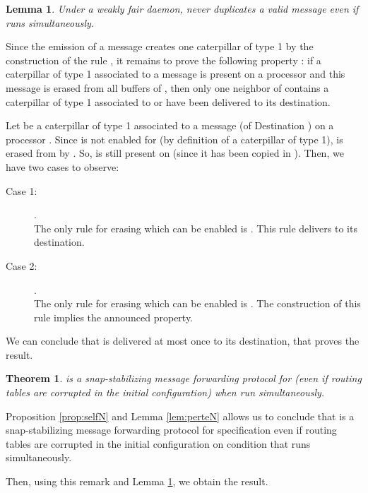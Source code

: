 \documentclass[11pt]{article}
\newtheorem{theorem}{Theorem}
\newtheorem{lemma}{Lemma}
\newenvironment{proof}{{\noindent\bf Proof. } }{{\hfill }}
\begin{document}
\begin{lemma} \label{lem:duplicationN}
Under a weakly fair daemon, \AN never duplicates a valid message even if  runs simultaneously.
\end{lemma}

\begin{proof}
Since the emission of a message creates one caterpillar of type 1 by the construction of the rule , it remains to prove the following property : if a caterpillar of type 1 associated to a message  is present on a processor  and this message is erased from all buffers of , then only one neighbor of  contains a caterpillar of type 1 associated to  or  have been delivered to its destination.

Let  be a caterpillar of type 1 associated to a message  (of Destination ) on a processor . Since  is not enabled for  (by definition of a caterpillar of type 1),  is erased from  by . So,  is still present on  (since it has been copied in ). Then, we have two cases to observe:

\begin{description}
\item [Case 1:] .\\
The only rule for erasing  which can be enabled is . This rule delivers  to its destination.
\item [Case 2:] .\\
The only rule for erasing  which can be enabled is . The construction of this rule implies the announced property.
\end{description}

We can conclude that  is delivered at most once to its destination, that proves the result.
\end{proof}

\begin{theorem} \label{th:snapN}
\AN is a snap-stabilizing message forwarding protocol for  (even if routing tables are corrupted in the initial configuration) when  run simultaneously.
\end{theorem}

\begin{proof}
Proposition \ref{prop:selfN} and Lemma \ref{lem:perteN} allows us to conclude that \AN is a snap-stabilizing message forwarding protocol for specification  even if routing tables are corrupted in the initial configuration on condition that  runs simultaneously.

Then, using this remark and Lemma \ref{lem:duplicationN}, we obtain the result.
\end{proof}
\end{document}
